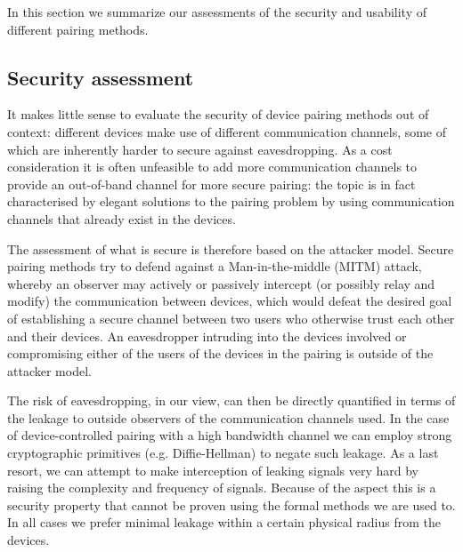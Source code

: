 \documentclass[conference, 12pt]{sty/IEEEtran}
\begin{document}
In this section we summarize our assessments of the security and usability of different pairing methods.

\subsection{Security assessment}
\label{ssec:security_assessment}

It makes little sense to evaluate the security of device pairing methods out of context: different devices make use of different communication channels, some of which are inherently harder to secure against eavesdropping.
As a cost consideration it is often unfeasible to add more communication channels to provide an out-of-band channel for more secure pairing: the topic is in fact characterised by elegant solutions to the pairing problem by using communication channels that already exist in the devices.

The assessment of what is secure is therefore based on the attacker model.
Secure pairing methods try to defend against a Man-in-the-middle (MITM) attack, whereby an observer may actively or passively intercept (or possibly relay and modify) the communication between devices, which would defeat the desired goal of establishing a secure channel between two users who otherwise trust each other and their devices.
An eavesdropper intruding into the devices involved or compromising either of the users of the devices in the pairing is outside of the attacker model.

The risk of eavesdropping, in our view, can then be directly quantified in terms of the leakage to outside observers of the communication channels used.
In the case of device-controlled pairing with a high bandwidth channel we can employ strong cryptographic primitives (e.g. Diffie-Hellman) to negate such leakage.
As a last resort, we can attempt to make interception of leaking signals very hard by raising the complexity and frequency of signals.
Because of the aspect this is a security property that cannot be proven using the formal methods we are used to.
In all cases we prefer minimal leakage within a certain physical radius from the devices.
\end{document}
